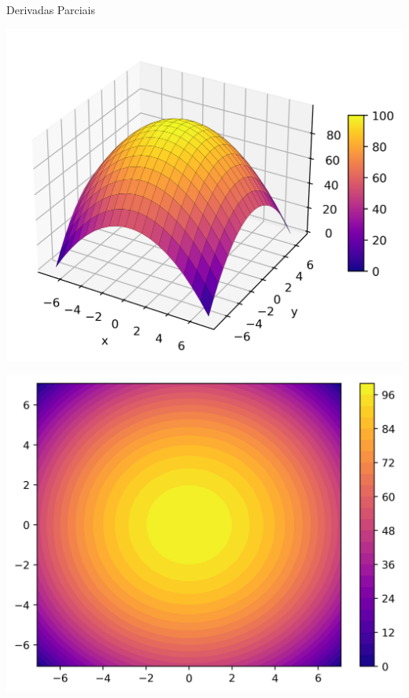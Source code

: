 \begin{frame}[label=der-parciais]{Derivadas Parciais}
\begin{center}
 \begin{minipage}{0.5\textwidth}
\includegraphics[scale=0.5]{figuras/der-parc2-1.png}
	 \end{minipage}
\begin{minipage}{0.4\textwidth}
	\includegraphics[scale=0.4]{figuras/der-parc2-1-nivel.png}
\end{minipage}
\end{center}


\end{frame}

